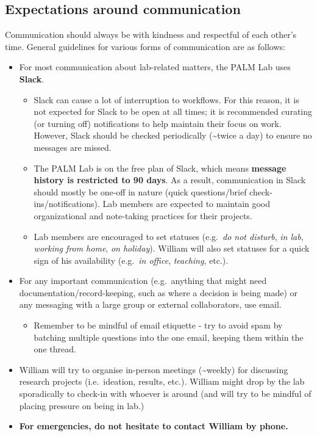\documentclass[
]{book}
\providecommand{\tightlist}{%
  \setlength{\itemsep}{0pt}\setlength{\parskip}{0pt}}
\begin{document}
\hypertarget{expectations-around-communication}{%
\subsection{Expectations around communication}\label{expectations-around-communication}}

Communication should always be with kindness and respectful of each other's time. General guidelines for various forms of communication are as follows:

\begin{itemize}
\tightlist
\item
  For most communication about lab-related matters, the PALM Lab uses \textbf{Slack}.

  \begin{itemize}
  \tightlist
  \item
    Slack can cause a lot of interruption to workflows. For this reason, it is not expected for Slack to be open at all times; it is recommended curating (or turning off) notifications to help maintain their focus on work. However, Slack should be checked periodically (\textasciitilde twice a day) to ensure no messages are missed.
  \item
    The PALM Lab is on the free plan of Slack, which means \textbf{message history is restricted to 90 days}. As a result, communication in Slack should mostly be one-off in nature (quick questions/brief check-ins/notifications). Lab members are expected to maintain good organizational and note-taking practices for their projects.
  \item
    Lab members are encouraged to set statuses (e.g.~\emph{do not disturb}, \emph{in lab}, \emph{working from home}, \emph{on holiday}). William will also set statuses for a quick sign of his availability (e.g.~\emph{in office}, \emph{teaching}, etc.).
  \end{itemize}
\item
  For any important communication (e.g.~anything that might need documentation/record-keeping, such as where a decision is being made) or any messaging with a large group or external collaborators, use email.

  \begin{itemize}
  \tightlist
  \item
    Remember to be mindful of email etiquette - try to avoid spam by batching multiple questions into the one email, keeping them within the one thread.
  \end{itemize}
\item
  William will try to organise in-person meetings (\textasciitilde weekly) for discussing research projects (i.e.~ideation, results, etc.). William might drop by the lab sporadically to check-in with whoever is around (and will try to be mindful of placing pressure on being in lab.)
\item
  \textbf{For emergencies, do not hesitate to contact William by phone.}
\end{itemize}
\end{document}
